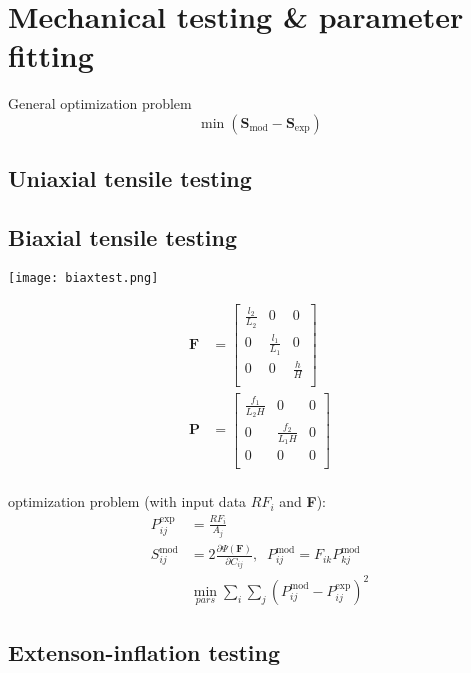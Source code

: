 \documentclass[../main.tex]{subfiles}
\begin{document}
\section{Mechanical testing \& parameter fitting}

General optimization problem
\begin{equation}
    \min(\textbf{S}_{\text{mod}}-\textbf{S}_{\text{exp}})
\end{equation}

\subsection{Uniaxial tensile testing}

\subsection{Biaxial tensile testing}

\texttt{[image: biaxtest.png]}

\begin{align}
    \textbf{F} &= \left[\begin{matrix}
        \frac{l_2}{L_2} & 0 & 0 \\
        0 & \frac{l_1}{L_1} & 0 \\
        0 & 0 & \frac{h}{H} \\
    \end{matrix}\right] \\
    \textbf{P} &= \left[\begin{matrix}
        \frac{f_1}{L_2H} & 0 & 0 \\
        0 & \frac{f_2}{L_1H} & 0 \\
        0 & 0 & 0 \\
    \end{matrix}\right] \\
\end{align}

optimization problem (with input data $RF_i$ and \textbf{F}):
\begin{align}
    P_{ij}^{\text{exp}} &= \frac{RF_i}{A_j} \\
    S_{ij}^{\text{mod}} &= 2\frac{\partial\Psi(\textbf{F})}{\partial C_{ij}},\;\; P_{ij}^{\text{mod}} = F_{ik}P_{kj}^{\text{mod}}\\
    &\min_{pars}\sum_i\sum_j\left(P_{ij}^{\text{mod}}-P_{ij}^{\text{exp}}\right)^2
\end{align}

\subsection{Extenson-inflation testing}
\end{document}
